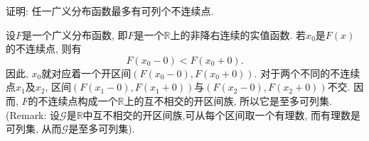 \begin{yyEx}
	证明: 任一广义分布函数最多有可列个不连续点.
\end{yyEx}
	\begin{yyProof}
	设$F$是一个广义分布函数, 即$F$是一个$\mathbb{R}$上的非降右连续的实值函数. 若$x_0$是$F(x)$的不连续点, 则有
	\begin{equation} F(x_0-0)<F(x_0+0).
	\end{equation}
	因此, $x_0$就对应着一个开区间$(F(x_0-0),F(x_0+0))$. 对于两个不同的不连续点$x_1$及$x_2$, 区间$(F(x_1-0),F(x_1+0))$与$(F(x_2-0),F(x_2+0))$不交. 因而, $F$的不连续点构成一个$\mathbb{R}$上的互不相交的开区间族, 所以它是至多可列集.(Remark: 设$\mathscr{G}$是$\mathbb{R}$中互不相交的开区间族,可从每个区间取一个有理数, 而有理数是可列集, 从而$\mathscr{G}$是至多可列集).
\end{yyProof}